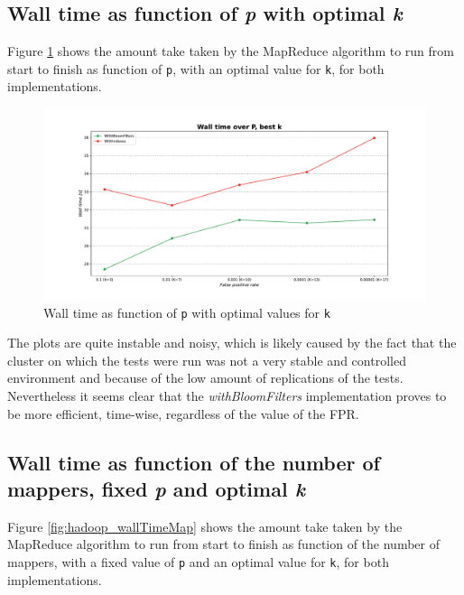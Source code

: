 \subsection*{Wall time as function of \textit{p} with optimal \textit{k}}

Figure \ref{fig:hadoop_wallTimeP_bestK} shows the amount take taken by the MapReduce algorithm to run from start to finish as function of \texttt{p}, with an optimal value for \texttt{k}, for both implementations.\\

\begin{figure}[H]
    \begin{center}
        \includegraphics[scale=.45,trim={3cm 0 3cm 0},clip]{img/hadoop_wallTimeP_bestK.pdf}
    \end{center}
    \vspace*{-0.5cm}
    \caption{Wall time as function of \texttt{p} with optimal values for \texttt{k}}
    \label{fig:hadoop_wallTimeP_bestK}
\end{figure}

\noindent The plots are quite instable and noisy, which is likely caused by the fact that the cluster on which the tests were run was not a very stable and controlled environment and because of the low amount of replications of the tests.\\
Nevertheless it seems clear that the \textit{withBloomFilters} implementation proves to be more efficient, time-wise, regardless of the value of the FPR.

\subsection*{Wall time as function of the number of mappers, fixed \textit{p} and optimal \textit{k}}

Figure \ref{fig:hadoop_wallTimeMap} shows the amount take taken by the MapReduce algorithm to run from start to finish as function of the number of mappers, with a fixed value of \texttt{p} and an optimal value for \texttt{k}, for both implementations.\\

